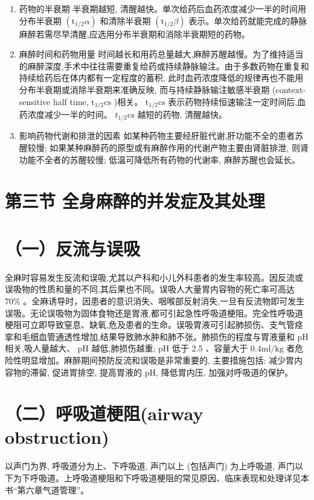 \documentclass[10pt]{article}
\begin{document}
\begin{enumerate}
  \item 药物的半衰期 半衰期越短, 清醒越快。单次给药后血药浓度减少一半的时间用分布半衰期 $\left(\mathrm{t}_{1 / 2} \alpha\right)$ 和清除半衰期 $\left(\mathrm{t}_{1 / 2} \beta\right)$ 表示。单次给药就能完成的静脉麻醉若需尽早清醒,应选用分布半衰期和消除半衰期短的药物。

  \item 麻醉时间和药物用量 时间越长和用药总量越大,麻醉苏醒越慢。为了维持适当的麻醉深度,手术中往往需要重复给药或持续静脉输注。由于多数药物在重复和持续给药后在体内都有一定程度的蓄积, 此时血药浓度降低的规律再也不能用分布半衰期或消除半衰期来准确反映, 而与持续静脉输注敏感半衰期 (context-sensitive half time, $\mathrm{t}_{1 / 2} \mathrm{cs}$ )相关。 $\mathrm{t}_{1 / 2} \mathrm{cs}$ 表示药物持续恒速输注一定时间后,血药浓度减少一半的时间。 $t_{1 / 2} \mathrm{cs}$ 越短的药物, 清醒越快。

  \item 影响药物代谢和排泄的因素 如某种药物主要经肝脏代谢,肝功能不全的患者苏醒较慢; 如果某种麻醉药的原型或有麻醉作用的代谢产物主要由肾脏排泄, 则肾功能不全者的苏醒较慢; 低温可降低所有药物的代谢率, 麻醉苏醒也会延长。

\end{enumerate}

\section*{第三节 全身麻醉的并发症及其处理}
\section*{（一）反流与误吸}
全麻时容易发生反流和误吸,尤其以产科和小儿外科患者的发生率较高。因反流或误吸物的性质和量的不同,其后果也不同。误吸人大量胃内容物的死亡率可高达 $70 \%$ 。全麻诱导时，因患者的意识消失、咽喉部反射消失,一旦有反流物即可发生误吸。无论误吸物为固体食物还是胃液,都可引起急性呼吸道梗阻。完全性呼吸道梗阻可立即导致窒息、缺氧,危及患者的生命。误吸胃液可引起肺损伤、支气管痉挛和毛细血管通透性增加,结果导致肺水肿和肺不张。肺损伤的程度与胃液量和 $\mathrm{pH}$ 相关,吸人量越大、 $\mathrm{pH}$ 越低,肺损伤越重; $\mathrm{pH}$ 低于 2.5 、容量大于 $0.4 \mathrm{ml} / \mathrm{kg}$ 者危险性明显增加。麻醉期间预防反流和误吸是非常重要的, 主要措施包括: 减少胃内容物的滞留, 促进胃排空, 提高胃液的 $\mathrm{pH}$, 降低胃内压, 加强对呼吸道的保护。

\section*{（二）呼吸道梗阻(airway obstruction)}
以声门为界, 呼吸道分为上、下呼吸道, 声门以上 (包括声门) 为上呼吸道, 声门以下为下呼吸道。上呼吸道梗阻和下呼吸道梗阻的常见原因、临床表现和处理详见本书“第六章气道管理”。
\end{document}
